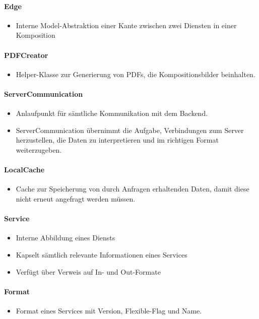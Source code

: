 \paragraph{Edge} 
\begin{itemize}
	\item Interne Model-Abstraktion einer Kante zwischen zwei Diensten in einer Komposition 
\end{itemize}
\paragraph{PDFCreator}
\begin{itemize}
	\item Helper-Klasse zur Generierung von PDFs, die Kompositionsbilder beinhalten. 
\end{itemize}

\paragraph{ServerCommunication}
\begin{itemize} 
	\item Anlaufpunkt für sämtliche Kommunikation mit dem Backend. 
	\item ServerCommunication übernimmt die Aufgabe, Verbindungen zum Server herzustellen, die Daten zu interpretieren und im richtigen Format weiterzugeben. 
\end{itemize}
\paragraph{LocalCache}
\begin{itemize} 
	\item Cache zur Speicherung von durch Anfragen erhaltenden Daten, damit diese nicht erneut angefragt werden müssen. 
\end{itemize}
\paragraph{Service}
\begin{itemize} 
	\item Interne Abbildung eines Diensts
	\item Kapselt sämtlich relevante Informationen eines Services
	\item Verfügt über Verweis auf In- und Out-Formate
\end{itemize}
\paragraph{Format}
\begin{itemize}	
	\item Format eines Services mit Version, Flexible-Flag und Name.
\end{itemize}

